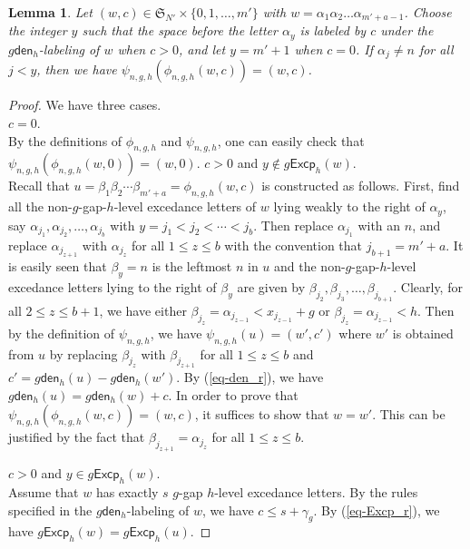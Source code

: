 \documentclass[12pt]{article}
\numberwithin{equation}{section}
\theoremstyle{plain}
\newtheorem{lemma}[theorem]{Lemma}
\def\den{\mathsf{den}}
\def\Excp{\mathsf{Excp}}
\begin{document}
 \begin{lemma}\label{lem-psi-den1}
 	Let $(w,c)\in \mathfrak{S}_{N'}\times\{ 0,1,\ldots, m'\}$ with $w=\alpha_1\alpha_2\ldots \alpha_{m'+a-1}$.  Choose the integer $y$ such that    the space before  the letter  $\alpha_y$ is labeled by $c$  under the   $g\den_h$-labeling  of $w$ when $c>0$,  and let $y=m'+1$ when $c=0$.   If   $\alpha_j\neq n$ for all $j<y$, then we have $\psi_{n,g,h}(\phi_{n,g,h}(w, c))=(w,c)$.  
 	\end{lemma}
 \begin{proof}  
 	We have three cases.\\
 		 $c=0$.\\
 	By  the definitions of $\phi_{n,g,h}$ and $\psi_{n,g,h}$, one can easily check that $\psi_{n,g,h}(\phi_{n,g,h}(w, 0))=(w,0). $
 	  $c>0$ and $y\notin g\Excp_h(w)$.\\
 	Recall that $u=\beta_1\beta_2\cdots \beta_{m'+a}=\phi_{n,g,h}(w,c)$ is constructed  as follows.
 	First, find all the  non-$g$-gap-$h$-level excedance letters of $w$ lying    weakly to  the right  of $\alpha_{y}$, say $\alpha_{j_1}, \alpha_{j_2}, \ldots, \alpha_{j_b}$ with $ y=j_1<j_2<\cdots<j_b$.  Then  replace $\alpha_{j_1}$ with an  $n$,   and replace  $\alpha_{j_{z+1}}$ with $\alpha_{j_{z}}$ for all $1\leq z\leq b $ with the convention that $j_{b+1}=m'+a$. 
 	It is easily seen that $\beta_{y}=n$ is the leftmost $n$ in $u$ and   the non-$g$-gap-$h$-level excedance letters  lying to the right of $\beta_{y}$ are  given by $\beta_{j_2}, \beta_{j_3}, \ldots, \beta_{j_{b+1}}$. Clearly, for all $2\leq z\leq b+1$, we have  either $\beta_{j_z}=\alpha_{j_{z-1}}< x_{j_{z-1}}+g$ or $\beta_{j_z}=\alpha_{j_{z-1}}<h$.    
 	Then by the definition of $\psi_{n,g,h}$,  we have $\psi_{n,g,h}(u)=(w', c')$ where $w'$ is obtained from  $u$ by replacing $\beta_{j_z}$ with $\beta_{j_{z+1}}$ for all $1\leq z\leq b$ and $c'=g\den_{h}(u)-g\den_{h}(w')$. 
 	By (\ref{eq-den_r}), we have $g\den_h(u)=g\den_h(w)+c$. In order to prove that $\psi_{n,g,h}(\phi_{n,g,h}(w,c))=(w,c)$, it suffices to show that $w=w'$. This can be justified by the fact that 
  $\beta_{j_{z+1}}=\alpha_{j_z}$ for all $1\leq z\leq b$.  
 	
 	
 		   $c>0$ and $y\in g\Excp_h(w)$.\\
 		Assume that  $w$ has exactly  $s$ $g$-gap $h$-level excedance letters. By the rules specified in the $g\den_h$-labeling of $w$,   we have $c\leq s+\gamma_g$.   By (\ref{eq-Excp_r}), we have $g\Excp_h(w)=g\Excp_h(u)$. 
 		

\end{proof}
\end{document}
